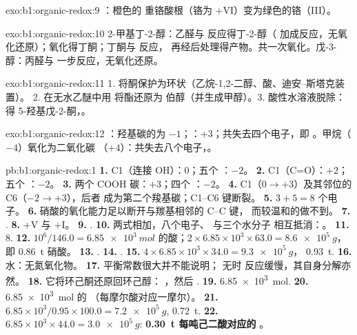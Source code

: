 \begin{solution}{exo:b1:organic-redox:9}
：橙色的
重铬酸根（铬为 $+$VI）变为绿色的铬（III）。
\end{solution}

\begin{solution}{exo:b1:organic-redox:10}
2-甲基丁-2-醇：乙醛与  反应得丁-2-醇（
加成反应，无氧化还原）；氧化得丁酮；丁酮与  反应，
再经后处理得产物。共一次氧化。戊-3-醇：丙醛与 
一步反应，无氧化还原。
\end{solution}

\begin{solution}{exo:b1:organic-redox:11}
1. 将酮保护为环状（乙烷-1,2-二醇、酸、迪安–斯塔克装置）。
2. 在无水乙醚中用  将酯还原为
伯醇（并生成甲醇）。3. 酸性水溶液脱除：
得 5-羟基戊-2-酮，。
\end{solution}

\begin{solution}{exo:b1:organic-redox:12}
：羟基碳的为 $-1$；：$+3$；共失去四个电子，即
。甲烷（$-4$）氧化为二氧化碳
（$+4$）：共失去八个电子，。
\end{solution}

\begin{solution}{pb:b1:organic-redox:1}
\textbf{1.} C1（连接 OH）：0；五个 ：$-2$。
\textbf{2.} C1（C=O）：$+2$；五个 ：$-2$。
\textbf{3.} 两个 COOH 碳：$+3$；四个 ：$-2$。
\textbf{4.} C1（$0 \to +3$）及其邻位的 C6（$-2 \to +3$），后者
成为第二个羧基碳；C1--C6 键断裂。
\textbf{5.} $3 + 5 = 8$ 个电子。
\textbf{6.} 硝酸的氧化能力足以断开与羰基相邻的 C--C 键，
而较温和的做不到。
\textbf{7.} .
\textbf{8.} $+$V 与 $+$I。
\textbf{9.} .
\textbf{10.} 两式相加，八个电子、 与三个水分子
相互抵消：。
\textbf{11.} 8.
\textbf{12.} $10^6/146.0 = \qty{6.85e3}{mol}$ 的酸；$2 \times 6.85 \times
10^3 \times 63.0 = \qty{8.6e5}{g}$，即 \qty{0.86}{t} 硝酸。
\textbf{13.} .
\textbf{14.} .
\textbf{15.} $4 \times 6.85 \times 10^3 \times 34.0 = \qty{9.3e5}{g}$，
\qty{0.93}{t}.
\textbf{16.} 水：无氮氧化物。
\textbf{17.} 平衡常数很大并不能说明；
无时  反应缓慢，其自身分解亦然。
\textbf{18.} 它将环己酮还原回环己醇：
，然后
.
\textbf{19.} \qty{6.85e3}{mol}.
\textbf{20.} \qty{6.85e3}{mol} 的 （每摩尔酸对应一摩尔）。
\textbf{21.} $6.85 \times 10^3/0.95 \times 100.0 = \qty{7.2e5}{g}$, \qty{0.72}{t}.
\textbf{22.} $6.85 \times 10^3 \times 44.0 = \qty{3.0e5}{g}$: \textbf{\qty{0.30}{t}
每吨己二酸对应的 }。
\end{solution}
